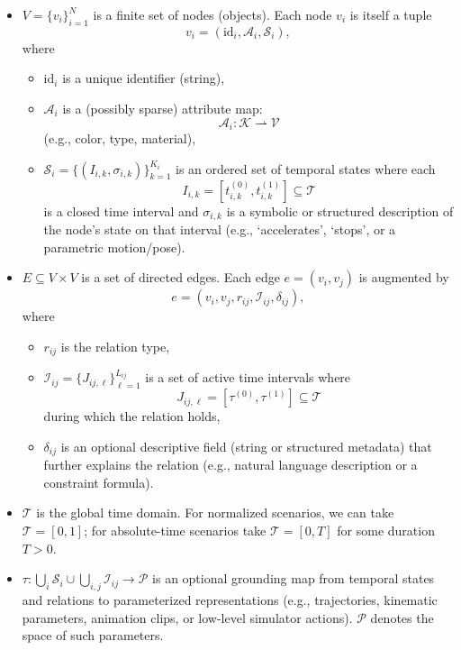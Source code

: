 \documentclass{article}
\begin{document}
\begin{itemize}
\item $V = \{v_i\}_{i=1}^N$ is a finite set of nodes (objects). Each node $v_i$ is itself a tuple
\begin{equation}
v_i = (\mathrm{id}_i, \mathcal{A}_i, \mathcal{S}_i),
\end{equation}
where
\begin{itemize}
\item $\mathrm{id}_i$ is a unique identifier (string),
\item $\mathcal{A}_i$ is a (possibly sparse) attribute map:
\[
\mathcal{A}_i : \mathcal{K} \rightharpoonup \mathcal{V}
\]
(e.g., color, type, material),
\item $\mathcal{S}_i = \{ (I_{i,k}, \sigma_{i,k}) \}_{k=1}^{K_i}$ is an ordered set of temporal states where each
\[
I_{i,k} = [t_{i,k}^{(0)}, t_{i,k}^{(1)}] \subseteq \mathcal{T}
\]
is a closed time interval and $\sigma_{i,k}$ is a symbolic or structured description of the node's state on that interval (e.g., `accelerates', `stops', or a parametric motion/pose).
\end{itemize}

\item $E \subseteq V \times V$ is a set of directed edges. Each edge $e = (v_i, v_j)$ is augmented by
\begin{equation}
e = (v_i, v_j, r_{ij}, \mathcal{I}_{ij}, \delta_{ij}),
\end{equation}
where
\begin{itemize}
\item $r_{ij}$ is the relation type,
\item $\mathcal{I}_{ij} = \{ J_{ij, \ell} \}_{\ell=1}^{L_{ij}}$ is a set of active time intervals where
\[
J_{ij, \ell} = [\tau^{(0)}, \tau^{(1)}] \subseteq \mathcal{T}
\]
during which the relation holds,
\item $\delta_{ij}$ is an optional descriptive field (string or structured metadata) that further explains the relation (e.g., natural language description or a constraint formula).
\end{itemize}

\item $\mathcal{T}$ is the global time domain. For normalized scenarios, we can take $\mathcal{T} = [0,1]$; for absolute-time scenarios take $\mathcal{T} = [0,T]$ for some duration $T > 0$.

\item $\tau: \bigcup_i \mathcal{S}_i \cup \bigcup_{i,j} \mathcal{I}_{ij} \to \mathcal{P}$ is an optional grounding map from temporal states and relations to parameterized representations (e.g., trajectories, kinematic parameters, animation clips, or low-level simulator actions). $\mathcal{P}$ denotes the space of such parameters.
\end{itemize}
\end{document}
